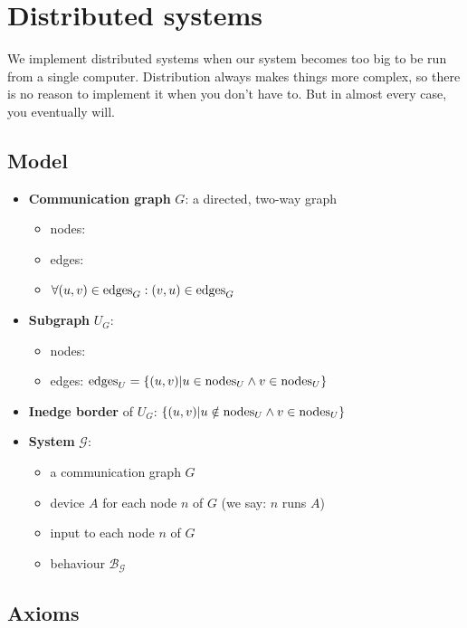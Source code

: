\section{Distributed systems}

We implement distributed systems when our system becomes too big to be run from a single computer. Distribution always makes things more complex, so there is no reason to implement it when you don't have to. But in almost every case, you eventually will. 

\subsection{Model}
\begin{itemize}
    \item \textbf{Communication graph} $G$: a directed, two-way graph
      \begin{itemize}
        \item nodes: 
        \item edges: 
        \item $\forall (u, v) \in  \text{edges}_{G} : (v, u) \in  \text{edges}_{G} $
      \end{itemize}
    \item \textbf{Subgraph} $U_G$:
      \begin{itemize}
        \item nodes: 
        \item edges: $ \text{edges}_{U}  = \{(u, v) | u \in  \text{nodes}_{U}  \land v \in  \text{nodes}_{U} \}$
      \end{itemize}
    \item \textbf{Inedge border} of $U_G$: $\{(u, v) | u \notin  \text{nodes}_{U}  \land v \in  \text{nodes}_{U} \}$
    \item \textbf{System} $\mathcal{G}$:
      \begin{itemize}
        \item a communication graph $G$
        \item device $A$ for each node $n$ of $G$ (we say: $n$ runs $A$)
        \item input to each node $n$ of $G$
        \item behaviour $\mathcal{B_G}$
      \end{itemize}
\end{itemize}


\subsection{Axioms}

